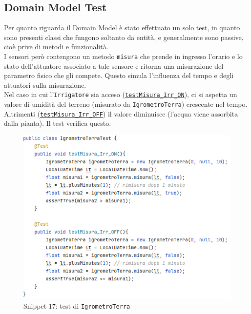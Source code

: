 \documentclass{article}
\newcommand{\code}[1]{\texttt{#1}}
\begin{document}
\subsection{Domain Model Test}
Per quanto riguarda il Domain Model è stato effettuato un solo test, in quanto sono presenti classi che fungono soltanto da entità, e generalmente sono passive, cioè prive di metodi e funzionalità.\\
I sensori però contengono un metodo \code{misura} che prende in ingresso l'orario e lo stato dell'attuatore associato a tale sensore e ritorna una misurazione del parametro fisico che gli compete. Questo simula l'influenza del tempo e degli attuatori sulla misurazione.\\
Nel caso in cui l'\code{Irrigatore} sia acceso (\hyperref[fig:snippet_IgrometroTerraTest]{\code{testMisura\_Irr\_ON}}), ci si aspetta un valore di umidità del terreno (misurato da \code{IgrometroTerra}) crescente nel tempo. Altrimenti (\hyperref[fig:snippet_IgrometroTerraTest]{\code{testMisura\_Irr\_OFF}}) il valore diminuisce (l'acqua viene assorbita dalla pianta). Il test verifica questo.

\begin{figure}[H]
    \centering
    \includegraphics[scale=0.5]{resources/images/Snippets/snippet_IgrometroTerraTest.png}
    \captionsetup{labelformat=empty,labelsep=none}
    \caption{Snippet 17: test di \code{IgrometroTerra}}
    \label{fig:snippet_IgrometroTerraTest}
\end{figure}
\end{document}
